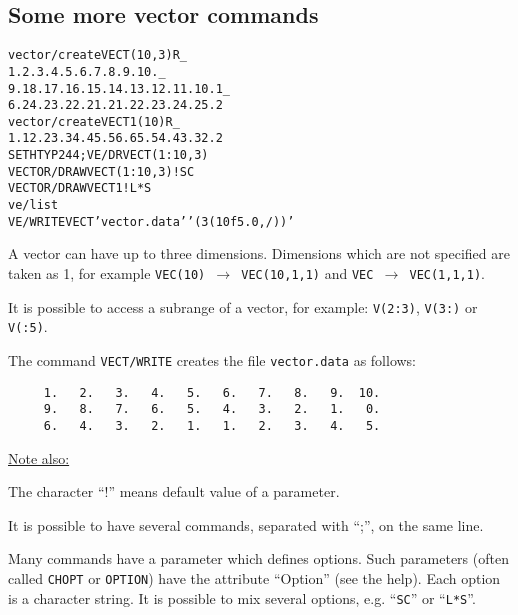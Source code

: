 \subsection{Some more vector commands}
\begin{alltt}
      vector/create VECT(10,3) R _
      1. 2. 3. 4. 5. 6. 7. 8. 9. 10. _
      9.1 8.1 7.1 6.1 5.1 4.1 3.1 2.1 1.1 0.1 _
      6.2 4.2 3.2 2.2 1.2 1.2 2.2 3.2 4.2 5.2
      vector/create VECT1(10) R _
      1.1 2.2 3.3 4.4 5.5 6.6 5.5 4.4 3.3 2.2
     SET HTYP 244 ; VE/DR VECT(1:10,3)
   VECTOR/DRAW VECT(1:10,3) ! SC
   VECTOR/DRAW VECT1 ! L*S
      ve/list
     VE/WRITE VECT 'vector.data' '(3(10f5.0,/))'
\end{alltt} 
\begin{DinglistE}
\item A vector can have up to three dimensions. Dimensions which are not
      specified are taken as 1, for example {\tt VEC(10) $\rightarrow$
      VEC(10,1,1)} and {\tt VEC $\rightarrow$ VEC(1,1,1)}.
\item It is possible to access a subrange of a vector, for example:
      {\tt V(2:3)}, {\tt V(3:)} or {\tt V(:5)}. 
\item The command {\tt VECT/WRITE} creates the file {\tt vector.data}
      as follows:
\begin{verbatim}
     1.   2.   3.   4.   5.   6.   7.   8.   9.  10.
     9.   8.   7.   6.   5.   4.   3.   2.   1.   0.
     6.   4.   3.   2.   1.   1.   2.   3.   4.   5.
\end{verbatim}

\underline{Note also:}

\item The character ``!'' means default value of a parameter.
\item It is possible to have several commands, separated with ``;'', on
      the same line.
\item Many commands have a parameter which defines
      options. Such parameters (often called {\tt CHOPT} or {\tt OPTION})
      have the attribute ``Option'' (see the help). Each option is 
      a character string. It is possible to mix several options, e.g.
      ``{\tt SC}'' or ``{\tt L*S}''.
\end{DinglistE}


\clearpage

